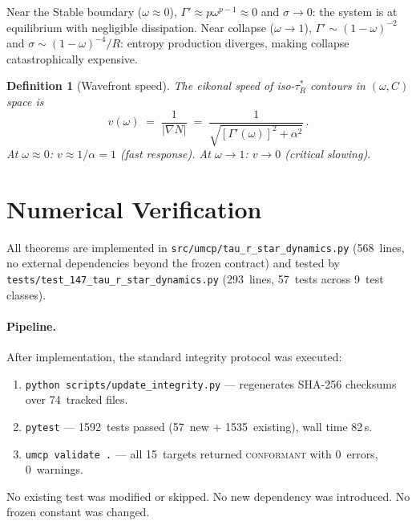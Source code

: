 \documentclass[
  aps,
  prd,
  twocolumn,
  showpacs,
  superscriptaddress,
  nofootinbib,
  floatfix
]{revtex4-2}
\newtheorem{definition}[theorem]{Definition}
\newcommand{\tR}{\tau_{\!R}^{*}}
\newcommand{\Gam}{\Gamma}
\newcommand{\beq}{\begin{equation}}
\newcommand{\eeq}{\end{equation}}
\begin{document}
Near the Stable boundary ($\omega\approx 0$),
$\Gam'\approx p\omega^{p-1}\approx 0$ and $\sigma\to 0$:
the system is at equilibrium with negligible dissipation.
Near collapse ($\omega\to 1$),
$\Gam'\sim (1-\omega)^{-2}$ and
$\sigma\sim(1-\omega)^{-4}/R$: entropy production diverges,
making collapse catastrophically expensive.

\begin{definition}[Wavefront speed]\label{def:wavefront}
The eikonal speed of iso-$\tR$ contours in $(\omega,C)$ space is
\beq\label{eq:wavefront}
  v(\omega) \;=\;
  \frac{1}{|\nabla N|}
  \;=\;
  \frac{1}{\sqrt{[\Gam'(\omega)]^2 + \alpha^2}}\,.
\eeq
At $\omega\approx 0$: $v\approx 1/\alpha=1$ (fast response).
At $\omega\to 1$: $v\to 0$ (critical slowing).
\end{definition}

\section{Numerical Verification}\label{sec:numerics}

All theorems are implemented in
\texttt{src/umcp/tau\_r\_star\_dynamics.py}
(568~lines, no external dependencies beyond the frozen contract)
and tested by
\texttt{tests/test\_147\_tau\_r\_star\_dynamics.py}
(293~lines, 57~tests across 9~test classes).

\paragraph{Pipeline.}
After implementation, the standard integrity protocol was executed:
\begin{enumerate}
  \item \texttt{python scripts/update\_integrity.py}
        --- regenerates SHA-256
        checksums over 74~tracked files.
  \item \texttt{pytest} --- 1592~tests passed (57~new + 1535~existing),
        wall time 82\,s.
  \item \texttt{umcp validate~.} --- all 15~targets returned
        \textsc{conformant} with 0~errors, 0~warnings.
\end{enumerate}

No existing test was modified or skipped.
No new dependency was introduced.
No frozen constant was changed.
\end{document}
